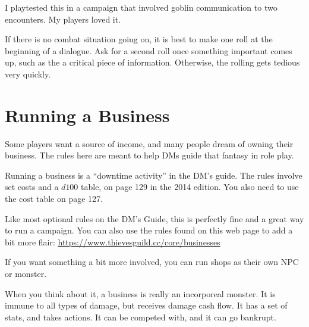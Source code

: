 \documentclass[twocolumn]{dndbook}
\begin{document}
I playtested this in a campaign that involved goblin communication to two encounters. My players loved it.\par

If there is no combat situation going on, it is best to make one roll at the beginning of a dialogue.
Ask for a second roll once something important comes up, such as the a critical piece of information.
Otherwise, the rolling gets tedious very quickly.





\section{Running a Business}

\begin{emphasisParagraph}
	Some players want a source of income,
	and many people dream of owning their business.
	The rules here are meant to help DMs guide
	that fantasy in role play.
\end{emphasisParagraph}


Running a business is a ``downtime activity'' in the DM's guide.
The rules involve set costs and a $d100$ table, on page 129 in the 2014 edition.
You also need to use the cost table on page 127.\par

Like most optional rules on the DM's Guide, this is perfectly fine and a great way to run a campaign.
You can also use the rules found on this web page to add a bit more flair:
\url{https://www.thievesguild.cc/core/businesses}\par

If you want something a bit more involved, you can run shops as their own NPC or monster.\par

\begin{emphasisParagraph}
	When you think about it, a business is really an incorporeal monster.
	It is immune to all types of damage, but receives damage
	cash flow. It has a set of stats, and takes actions.
	It can be competed with, and it can go bankrupt.
\end{emphasisParagraph}
\end{document}
